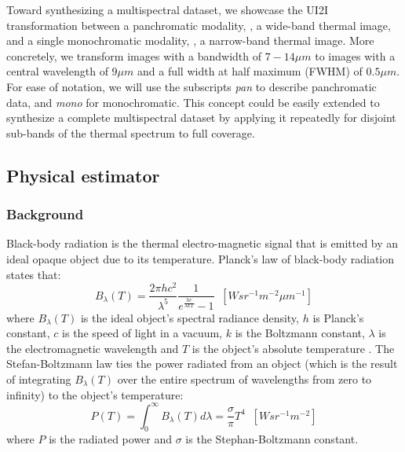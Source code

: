 Toward synthesizing a multispectral dataset, we showcase the UI2I transformation between a panchromatic modality, \ie, a wide-band thermal image, and a single monochromatic modality, \ie, a narrow-band thermal image.
More concretely, we transform images with a bandwidth of $7 - 14 \mu m$ to images with a central wavelength of $9\mu m$ and a full width at half maximum (FWHM) of $0.5 \mu m$.
For ease of notation, we will use the subscripts \emph{pan} to describe panchromatic data, and \emph{mono} for monochromatic.
This concept could be easily extended to synthesize a complete multispectral dataset by applying it repeatedly for disjoint sub-bands of the thermal spectrum to full coverage.
\subsection{Physical estimator}

\subsubsection{Background}
Black-body radiation is the thermal electro-magnetic signal that is emitted by an ideal opaque object due to its temperature.
Planck's law of black-body radiation states that:
\begin{equation} \label{eq:Plancks-law}
  B_{\lambda}(T) = \frac{2\pi hc^2}{\lambda^5}\frac{1}{e^{\frac{hc}{\lambda kT}} - 1} \; \; \left[W sr^{-1} m^{-2} \mu m^{-1}\right]
\end{equation}
where $B_{\lambda}(T)$ is the ideal object's spectral radiance density, $h$ is Planck's constant, $c$ is the speed of light in a vacuum, $k$ is the Boltzmann constant, $\lambda$ is the electromagnetic wavelength and $T$ is the object's absolute temperature \cite{FundamentalsOfInfraredThermalImaging}.
The Stefan-Boltzmann law \cite{surhone2010stefan} ties the power radiated from an object (which is the result of integrating $B_{\lambda}(T)$ over the entire spectrum of wavelengths from zero to infinity) to the object's temperature:
\begin{equation} \label{eq:stephan-boltzmann-ideal}
    P(T) = \int_0^\infty B_{\lambda}(T) d\lambda = \frac{\sigma}{\pi} T^4 \; \;\left[W sr^{-1} m^{-2}\right]
\end{equation}
where $P$ is the radiated power and $\sigma$ is the Stephan-Boltzmann constant. 

